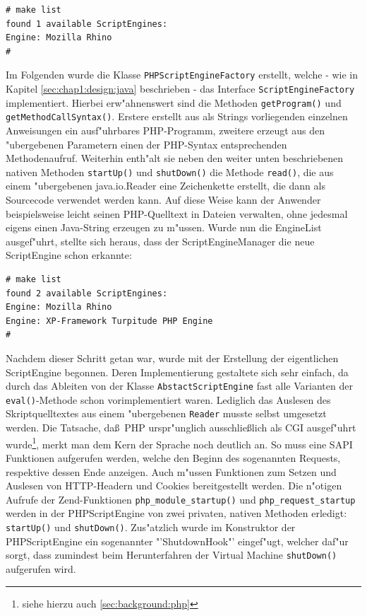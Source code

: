 \begin{lstlisting}[caption=erste Tests]
# make list
found 1 available ScriptEngines:
Engine: Mozilla Rhino
#
\end{lstlisting}

Im Folgenden wurde die Klasse \texttt{PHPScriptEngineFactory} erstellt, welche - wie in Kapitel
\ref{sec:chap1:design:java} beschrieben -
das Interface \texttt{ScriptEngineFactory} implementiert. Hierbei erw"ahnenswert sind die Methoden 
\texttt{getProgram()} und \texttt{getMethodCallSyntax()}. Erstere erstellt aus als Strings vorliegenden
einzelnen Anweisungen ein ausf"uhrbares PHP-Programm, zweitere erzeugt aus den "ubergebenen Parametern
einen der PHP-Syntax entsprechenden Methodenaufruf. Weiterhin enth"alt sie neben den weiter unten
beschriebenen nativen Methoden \texttt{startUp()} und \texttt{shutDown()} die Methode \texttt{read()}, die
aus einem "ubergebenen java.io.Reader eine Zeichenkette erstellt, die dann als Sourcecode verwendet
werden kann. Auf diese Weise kann der Anwender beispielsweise leicht seinen PHP-Quelltext in Dateien
verwalten, ohne jedesmal eigens einen Java-String erzeugen zu m"ussen.
Wurde nun die EngineList ausgef"uhrt, stellte sich heraus, dass der ScriptEngineManager die neue ScriptEngine schon erkannte:

\begin{lstlisting}[caption=Neue ScriptEngine]
# make list
found 2 available ScriptEngines:
Engine: Mozilla Rhino
Engine: XP-Framework Turpitude PHP Engine
#
\end{lstlisting}

Nachdem dieser Schritt getan war, wurde mit der Erstellung der eigentlichen ScriptEngine begonnen. Deren
Implementierung gestaltete sich sehr einfach, da durch das Ableiten von der Klasse \texttt{AbstactScriptEngine} 
fast alle Varianten der \texttt{eval()}-Methode schon vorimplementiert waren. Lediglich das Auslesen des
Skriptquelltextes aus einem "ubergebenen \texttt{Reader} musste selbst umgesetzt werden. 
Die Tatsache, da\ss\ PHP urspr"unglich ausschlie\ss lich als CGI ausgef"uhrt wurde\footnote{
siehe hierzu auch \ref{sec:background:php}
}, merkt man dem Kern der Sprache noch
deutlich an. So muss eine SAPI Funktionen aufgerufen werden, welche den Beginn des sogenannten Requests, respektive
dessen Ende anzeigen. Auch m"ussen Funktionen zum Setzen und Auslesen von HTTP-Headern und Cookies bereitgestellt
werden. Die n"otigen Aufrufe der Zend-Funktionen \texttt{php\_module\_startup()} und \texttt{php\_request\_startup}
werden in der PHPScriptEngine von zwei privaten, nativen Methoden erledigt: \texttt{startUp()} und \texttt{shutDown()}. 
Zus"atzlich wurde im Konstruktor der PHPScriptEngine ein sogenannter "'ShutdownHook"' eingef"ugt, welcher daf"ur 
sorgt, dass zumindest beim Herunterfahren der Virtual Machine \texttt{shutDown()} aufgerufen wird.

